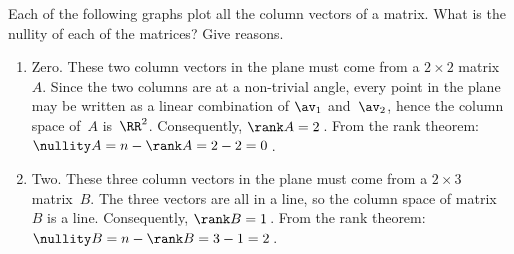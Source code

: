 \begin{example} \label{eg:}
Each of the following graphs plot all the column vectors of a matrix. What is the nullity of each of the matrices?  Give reasons.
\begin{enumerate}
\item {}
\begin{solution} 
Zero.
These two column vectors in the plane must come from a \(2\times2\) matrix~\(A\).
Since the two columns are at a non-trivial angle, every point in the plane may be written as a linear combination of \(\av_1\) and~\(\av_2\), hence the column space of~\(A\) is~\(\RR^2\).
Consequently, \(\rank A=2\)\,. 
From the rank theorem: \(\nullity A=n-\rank A=2-2=0\)\,. 
\end{solution}


\item {}
\begin{solution} 
Two.
These three column vectors in the plane must come from a \(2\times3\) matrix~\(B\).
The three vectors are all in a line, so the column space of matrix~\(B\) is a line.
Consequently, \(\rank B=1\)\,. 
From the rank theorem: \(\nullity B=n-\rank B=3-1=2\)\,. 
\end{solution}



\end{enumerate}
\end{example}
